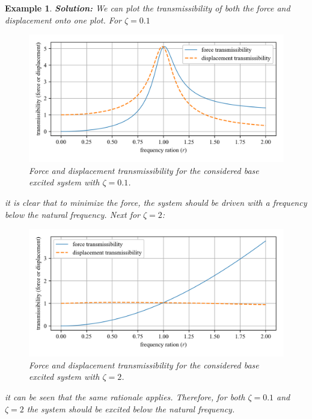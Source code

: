 \documentclass[12pt,letter]{article}
\newtheorem{ex}{Example}
\numberwithin{ex}{section} %
\newenvironment{example}{\begin{mdframed}[middlelinewidth=0.5mm]\begin{ex}\normalfont}{\end{ex}\end{mdframed}}
\numberwithin{re}{section} %
\begin{document}
\begin{example}
					\noindent\textbf{Solution:} We can plot the transmissibility of both the force and displacement onto one plot. For $\zeta=0.1$
					\begin{figure}[H]
						\centering
						\includegraphics[]{../Figures/base_excitation_force_and_displacement_transmissibility_1.png}
						\caption{Force and displacement transmissibility for the considered base excited system with $\zeta=0.1$.}
					\end{figure}
					it is clear that to minimize the force, the system should be driven with a frequency below the natural frequency. Next for  $\zeta=2$:
					\begin{figure}[H]
						\centering
						\includegraphics[]{../Figures/base_excitation_force_and_displacement_transmissibility_2.png}
						\caption{Force and displacement transmissibility for the considered base excited system with $\zeta=2$.}
					\end{figure}			
					it can be seen that the same rationale applies. Therefore, for both $\zeta=0.1$ and $\zeta=2$ the system should be excited below the natural frequency.
				
				\end{example}
	
			
							
\end{document}
